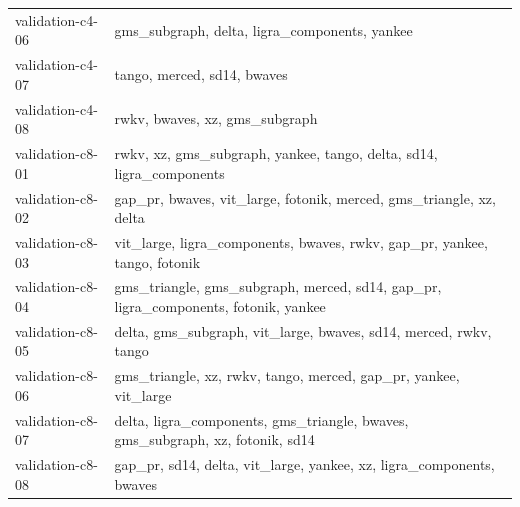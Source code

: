 \begin{tabular}{ll}
validation-c4-06 & gms\_subgraph, delta, ligra\_components, yankee \\
validation-c4-07 & tango, merced, sd14, bwaves \\
validation-c4-08 & rwkv, bwaves, xz, gms\_subgraph \\
validation-c8-01 & rwkv, xz, gms\_subgraph, yankee, tango, delta, sd14, ligra\_components \\
validation-c8-02 & gap\_pr, bwaves, vit\_large, fotonik, merced, gms\_triangle, xz, delta \\
validation-c8-03 & vit\_large, ligra\_components, bwaves, rwkv, gap\_pr, yankee, tango, fotonik \\
validation-c8-04 & gms\_triangle, gms\_subgraph, merced, sd14, gap\_pr, ligra\_components, fotonik, yankee \\
validation-c8-05 & delta, gms\_subgraph, vit\_large, bwaves, sd14, merced, rwkv, tango \\
validation-c8-06 & gms\_triangle, xz, rwkv, tango, merced, gap\_pr, yankee, vit\_large \\
validation-c8-07 & delta, ligra\_components, gms\_triangle, bwaves, gms\_subgraph, xz, fotonik, sd14 \\
validation-c8-08 & gap\_pr, sd14, delta, vit\_large, yankee, xz, ligra\_components, bwaves \\
\bottomrule
\end{tabular}
